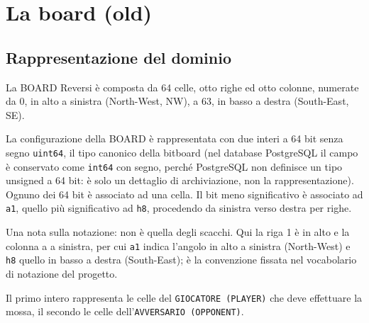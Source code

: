 %
%
%
%
%
%
%
%
\chapter{La board (old)}

\section{Rappresentazione del dominio}

La BOARD Reversi è composta da 64 celle, otto righe ed otto colonne, numerate da 0, in alto a sinistra (North-West, NW),
a 63, in basso a destra (South-East, SE).

La configurazione della BOARD è rappresentata con due interi a 64 bit senza segno \texttt{uint64}, il tipo canonico della bitboard (nel database PostgreSQL il campo è conservato come \texttt{int64} con segno, perché PostgreSQL non definisce un tipo unsigned a 64 bit: è solo un dettaglio di archiviazione, non la rappresentazione).
Ognuno dei 64 bit è associato ad una cella. Il bit meno significativo è associato ad \texttt{a1}, quello più significativo ad \texttt{h8},
procedendo da sinistra verso destra per righe.

Una nota sulla notazione: non è quella degli scacchi. Qui la riga 1 è in alto e la colonna a a sinistra,
per cui \texttt{a1} indica l'angolo in alto a sinistra (North-West) e \texttt{h8} quello in basso a destra (South-East);
è la convenzione fissata nel vocabolario di notazione del progetto.

Il primo intero rappresenta le celle del \texttt{GIOCATORE (PLAYER)} che deve effettuare la mossa, il secondo le celle dell'\texttt{AVVERSARIO (OPPONENT)}.

